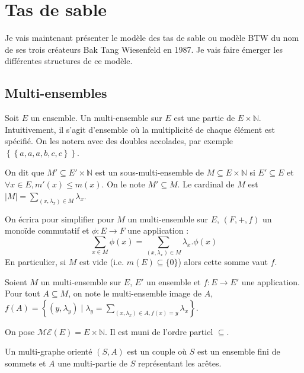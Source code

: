 
\section{Tas de sable}

Je vais maintenant présenter le modèle des tas de sable ou modèle BTW du nom de
ses trois créateurs Bak Tang Wiesenfeld en 1987. Je vais faire émerger les
différentes structures de ce modèle.

\subsection{Multi-ensembles}

\begin{definition}
Soit $E$ un ensemble.
Un multi-ensemble sur $E$ est une partie de $E \times \mathbb{N}$.
Intuitivement, il s'agit d'ensemble où la multiplicité de chaque élément
est spécifié.
On les notera avec des doubles accolades, par exemple $\left\{\left\{ a, a,
a, b, c, c \right\}\right\}$.

On dit que $M' \subseteq E' \times \mathbb{N}$ est un sous-multi-ensemble de
$M \subseteq E \times \mathbb{N}$ si $E' \subseteq E$ et
$\forall x \in E, m'(x) \leqslant m(x)$. On le note $M' \subseteq M$.
Le cardinal de $M$ est $|M| = \sum_{\left(x, \lambda_x\right) \in M} \lambda_x$.

On écrira pour simplifier pour $M$ un multi-ensemble sur $E$, $(F, +, f)$ un
monoïde commutatif et $\phi: E \rightarrow F$ une application :
$$
\sum_{x \in M} \phi(x) = \sum_{(x, \lambda_x) \in M} \lambda_x . \phi(x)
$$
En particulier, si $M$ est vide (i.e. $m(E) \subseteq \{0\}$) alors cette somme
vaut $f$.

Soient $M$ un multi-ensemble sur $E$, $E'$ un ensemble et
$f: E \rightarrow E'$ une application.
Pour tout $A \subseteq M$, on note le multi-ensemble image de $A$,
$\displaystyle f(A) = \left\{ (y, \lambda_y) \;|\; \lambda_y =
\sum_{(x, \lambda_x) \in A, f(x) = y} \lambda_x \right\}$.
\end{definition}

\begin{definition}
On pose $\mathcal{ME}(E) = E \times \mathbb{N}$.
Il est muni de l'ordre partiel $\subseteq$.
\end{definition}

\begin{definition}
Un multi-graphe orienté $(S, A)$ est un couple où $S$ est un ensemble fini de sommets
et $A$ une multi-partie de $S$ représentant les arêtes.
\end{definition}



